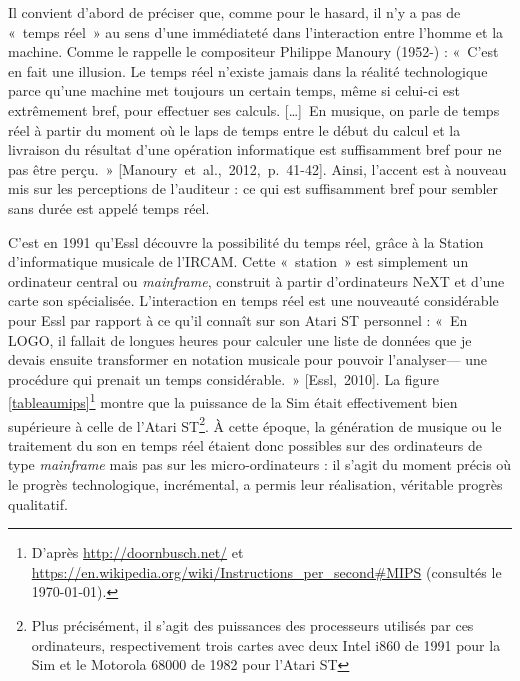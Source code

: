 \documentclass[a4paper,12pt]{article}
\newcommand{\guill}[1]{«~#1~»}
\newcommand{\tpp}[0]{[\dots]}
\newcommand{\cicite}[1]{{\footnotesize[#1]}}
\begin{document}
Il convient d'abord de préciser que, comme pour le hasard, il n'y a pas de \guill{temps réel} au sens d'une immédiateté dans l'interaction entre l'homme et la machine. Comme le rappelle le compositeur Philippe Manoury (1952-) : \guill{C'est en fait une illusion. Le temps réel n'existe jamais dans la réalité technologique parce qu'une machine met toujours un certain temps, même si celui-ci est extrêmement bref, pour effectuer ses calculs. \tpp~En musique, on parle de temps réel à partir du moment où le laps de temps entre le début du calcul et la livraison du résultat d'une opération informatique est suffisamment bref pour ne pas être perçu.} \cicite{Manoury~et~al.,~2012,~p.~41-42}. Ainsi, l'accent est à nouveau mis sur les perceptions de l'auditeur : ce qui est suffisamment bref pour sembler sans durée est appelé temps réel.

C'est en 1991 qu'Essl découvre la possibilité du temps réel, grâce à la Station d'informatique musicale de l'IRCAM. Cette \guill{station} est simplement un ordinateur central ou \emph{mainframe}, construit à partir d'ordinateurs NeXT et d'une carte son spécialisée. L'interaction en temps réel est une nouveauté considérable pour Essl par rapport à ce qu'il connaît sur son Atari ST personnel : \guill{En LOGO, il fallait de longues heures pour calculer une liste de données que je devais ensuite transformer en notation musicale pour pouvoir l'analyser--- une procédure qui prenait un temps considérable.} \cicite{Essl,~2010}. La figure \ref{tableaumips}\footnote{D'après \href{http://doornbusch.net/}{http://doornbusch.net/} et  \href{https://en.wikipedia.org/wiki/Instruœctions\_per\_second\#MIPS}{https://en.wikipedia.org/wiki/Instructions\_per\_second\#MIPS} (consultés le \today).} montre que la puissance de la Sim était effectivement bien supérieure à celle de l'Atari ST\footnote{Plus précisément, il s'agit des puissances des processeurs utilisés par ces ordinateurs, respectivement trois cartes avec deux Intel i860 de 1991 pour la Sim et le Motorola 68000 de 1982 pour l'Atari ST}. À cette époque, la génération de musique ou le traitement du son en temps réel étaient donc possibles sur des ordinateurs de type \emph{mainframe} mais pas sur les micro-ordinateurs : il s'agit du moment précis où le progrès technologique, incrémental, a permis leur réalisation, véritable progrès qualitatif.
\end{document}
